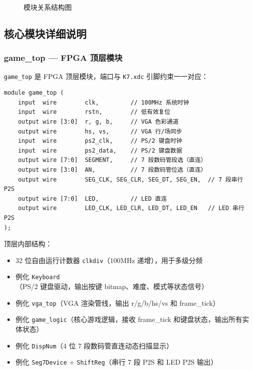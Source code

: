 \documentclass[12pt,a4paper]{ctexart}
\begin{document}
\begin{figure}[H]
{%
}
\caption{模块关系结构图}
\label{fig:modules}
\end{figure}

\subsection{核心模块详细说明}

\subsubsection{game\_top --- FPGA 顶层模块}

\texttt{game\_top} 是 FPGA 顶层模块，端口与 \texttt{K7.xdc} 引脚约束一一对应：

\begin{lstlisting}
module game_top (
    input  wire        clk,         // 100MHz 系统时钟
    input  wire        rstn,        // 低有效复位
    output wire [3:0]  r, g, b,     // VGA 色彩通道
    output wire        hs, vs,      // VGA 行/场同步
    input  wire        ps2_clk,     // PS/2 键盘时钟
    input  wire        ps2_data,    // PS/2 键盘数据
    output wire [7:0]  SEGMENT,     // 7 段数码管段选（直连）
    output wire [3:0]  AN,          // 7 段数码管位选（直连）
    output wire        SEG_CLK, SEG_CLR, SEG_DT, SEG_EN,  // 7 段串行 P2S
    output wire [7:0]  LED,         // LED 直连
    output wire        LED_CLK, LED_CLR, LED_DT, LED_EN   // LED 串行 P2S
);
\end{lstlisting}

顶层内部结构：
\begin{itemize}
    \item 32 位自由运行计数器 \texttt{clkdiv}（100MHz 递增），用于多级分频
    \item 例化 \texttt{Keyboard}（PS/2 键盘驱动，输出按键 bitmap、难度、模式等状态信号）
    \item 例化 \texttt{vga\_top}（VGA 渲染管线，输出 r/g/b/hs/vs 和 frame\_tick）
    \item 例化 \texttt{game\_logic}（核心游戏逻辑，接收 frame\_tick 和键盘状态，输出所有实体状态）
    \item 例化 \texttt{DispNum}（4 位 7 段数码管直连动态扫描显示）
    \item 例化 \texttt{Seg7Device} + \texttt{ShiftReg}（串行 7 段 P2S 和 LED P2S 输出）
\end{itemize}
\end{document}
